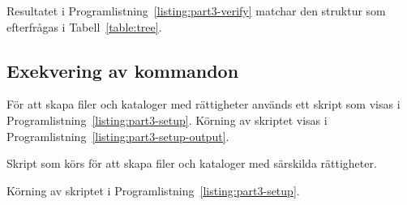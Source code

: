 Resultatet i Programlistning~\ref{listing:part3-verify} matchar den
struktur som efterfrågas i Tabell~\ref{table:tree}.



\subsection{Exekvering av kommandon}
För att skapa filer och kataloger med rättigheter används ett skript som visas
i Programlistning~\ref{listing:part3-setup}. Körning av skriptet visas i
Programlistning~\ref{listing:part3-setup-output}.

\begin{listing}[H]
\caption{Skript som körs för att skapa filer och kataloger med särskilda rättigheter.}
\label{listing:part3-setup}
\end{listing}

\begin{listing}[H]
\caption{Körning av skriptet i Programlistning~\ref{listing:part3-setup}.}
\label{listing:part3-setup-output}
\end{listing}

%
%
%


